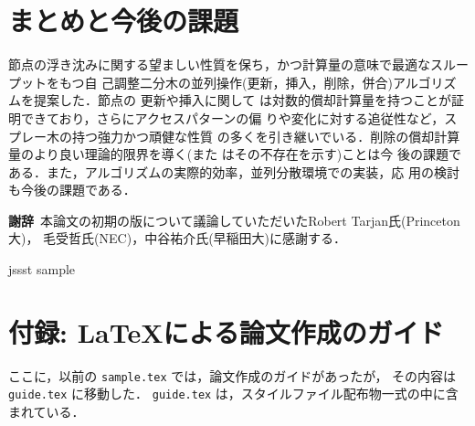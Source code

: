 \documentclass[T]{compsoft}
\begin{document}
\section{まとめと今後の課題}

節点の浮き沈みに関する望ましい性質を保ち，かつ計算量の意味で最適なスルー
プットをもつ自
己調整二分木の並列操作(更新，挿入，削除，併合)アルゴリズムを提案した．節点の
更新や挿入に関して
は対数的償却計算量を持つことが証明できており，さらにアクセスパターンの偏
りや変化に対する追従性など，スプレー木の持つ強力かつ頑健な性質
の多くを引き継いでいる．削除の償却計算量のより良い理論的限界を導く(また
はその不存在を示す)ことは今
後の課題である．また，アルゴリズムの実際的効率，並列分散環境での実装，応
用の検討も今後の課題である．


{\bf 謝辞}\
本論文の初期の版について議論していただいたRobert Tarjan氏(Princeton大)，
毛受哲氏(NEC)，中谷祐介氏(早稲田大)に感謝する．

 {jssst}
 {sample}

\appendix
\section{付録: \LaTeX による論文作成のガイド} 

ここに，以前の \verb|sample.tex| では，論文作成のガイドがあったが，
その内容は \verb|guide.tex| に移動した．
\verb|guide.tex| は，スタイルファイル配布物一式の中に含まれている．
\end{document}
